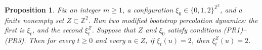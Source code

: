 \documentclass{article}
\newcommand{\bZ}{{\mathbb Z}}
\numberwithin{equation}{section}
\newtheorem{prop}[theorem]{Proposition}
\begin{document}
\begin{prop}
\label{prop:restriction}
    Fix an integer $m \geq 1$, a configuration $\xi_0 \in \{0,1,2\}^{\bZ^2}$, and a finite nonempty set $Z \subset \bZ^2$.
    Run two modified bootstrap percolation dynamics:  the first is $\xi_t$, and the second $\xi_t^Z$. 
    Suppose that $Z$ and $\xi_0$ satisfy conditions (PR1)--(PR3).
    Then for every $t \geq 0$ and every $u \in Z$, if $\xi_t(u) = 2$, then $\xi_t^Z(u) = 2$.

\end{prop}
\end{document}
